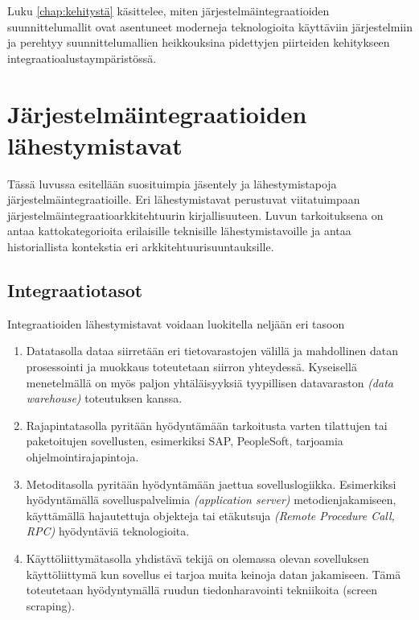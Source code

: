 Luku \ref{chap:kehitystä} käsittelee, miten järjestelmäintegraatioiden suunnittelumallit ovat asentuneet moderneja teknologioita käyttäviin järjestelmiin ja perehtyy suunnittelumallien heikkouksina pidettyjen piirteiden kehitykseen integraatioalustaympäristössä.


\chapter{Järjestelmäintegraatioiden lähestymistavat} \label{chap:lähestymis_tavat}

Tässä luvussa esitellään suosituimpia jäsentely ja lähestymistapoja järjestelmäintegraatioille. Eri lähestymistavat perustuvat viitatuimpaan järjestelmäintegraatioarkkitehtuurin kirjallisuuteen. Luvun tarkoituksena on antaa kattokategorioita erilaisille teknisille lähestymistavoille ja antaa historiallista kontekstia eri arkkitehtuurisuuntauksille.

\section{Integraatiotasot}

Integraatioiden lähestymistavat voidaan luokitella neljään eri tasoon \citep[sivu 21-23]{linthicum2000enterprise}

\begin{enumerate}
   \item Datatasolla dataa siirretään eri tietovarastojen välillä ja mahdollinen datan prosessointi ja muokkaus toteutetaan siirron yhteydessä. Kyseisellä menetelmällä on myös paljon yhtäläisyyksiä tyypillisen datavaraston \textit{(data warehouse)} toteutuksen kanssa.
   \item Rajapintatasolla pyritään hyödyntämään tarkoitusta varten tilattujen tai paketoitujen sovellusten, esimerkiksi SAP, PeopleSoft, tarjoamia ohjelmointirajapintoja.
   \item Metoditasolla pyritään hyödyntämään jaettua sovelluslogiikka. Esimerkiksi hyödyntämällä sovelluspalvelimia \textit{(application server)} metodienjakamiseen,  käyttämällä hajautettuja objekteja tai etäkutsuja \textit{(Remote Procedure Call, RPC)} hyödyntäviä teknologioita.
   \item Käyttöliittymätasolla yhdistävä tekijä on olemassa olevan sovelluksen käyttöliittymä kun sovellus ei tarjoa muita keinoja datan jakamiseen. Tämä toteutetaan hyödyntymällä ruudun tiedonharavointi tekniikoita (screen scraping).
   
\end{enumerate}

